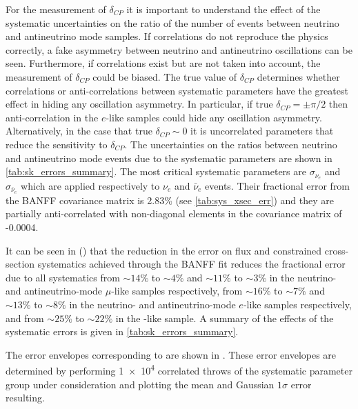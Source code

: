 For the measurement of $\delta_{CP}$ it is important to understand the effect of the systematic uncertainties on the ratio of the number of events between neutrino and antineutrino mode samples. If correlations do not reproduce the physics correctly, a fake asymmetry between neutrino and antineutrino oscillations can be seen. Furthermore, if correlations exist but are not taken into account, the measurement of $\delta_{CP}$ could be biased. The true value of $\delta_{CP}$ determines whether correlations or anti-correlations between systematic parameters have the greatest effect in hiding any oscillation asymmetry. In particular, if true $\delta_{CP} = \pm \pi/2$ then anti-correlation in the $e$-like samples could hide any oscillation asymmetry. Alternatively, in the case that true $\delta_{CP} \sim 0$ it is uncorrelated parameters that reduce the sensitivity to $\delta_{CP}$. The uncertainties on the ratios between neutrino and antineutrino mode events due to the systematic parameters are shown in \cref{tab:sk_errors_summary}. The most critical systematic parameters are $\sigma_{\nu_e}$ and $\sigma_{\bar{\nu}_e}$ which are applied respectively to $\nu_e$ and $\bar{\nu}_e$ events. Their fractional error from the BANFF covariance matrix is 2.83\% (see \cref{tab:sys_xsec_err}) and they are partially anti-correlated with non-diagonal elements in the covariance matrix of -0.0004.

It can be seen in  () that the reduction in the error on flux and constrained cross-section systematics achieved through the BANFF fit reduces the fractional error due to all systematics from $\sim 14\%$ to $\sim 4\%$ and $\sim 11\%$ to $\sim 3\%$ in the neutrino- and antineutrino-mode $\mu$-like samples respectively, from $\sim 16\%$ to $\sim 7\%$ and $\sim 13\%$ to $\sim 8\%$ in the neutrino- and antineutrino-mode $e$-like samples respectively, and from $\sim 25\%$ to $\sim 22\%$ in the \nueCConepi{}-like sample. A summary of the effects of the systematic errors is given in \cref{tab:sk_errors_summary}.



The error envelopes corresponding to  are shown in . These error envelopes are determined by performing \num{1e4} correlated throws of the systematic parameter group under consideration and plotting the mean and Gaussian $1\sigma$ error resulting.










\clearpage



